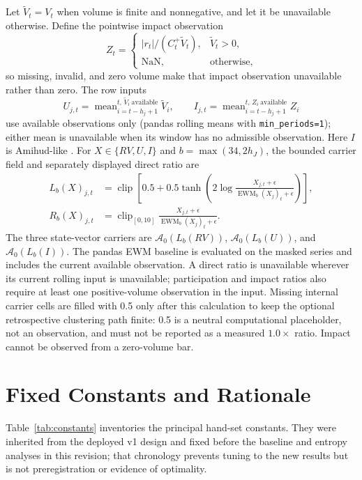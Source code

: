 \documentclass{article}
\newcommand{\clip}{\operatorname{clip}}
\newcommand{\EWM}{\operatorname{EWM}}
\begin{document}
Let $\widetilde V_t=V_t$ when volume is finite and nonnegative, and let it be unavailable otherwise. Define the pointwise impact observation
\begin{equation}
Z_t=\begin{cases}|r_t|/(C_t^+\widetilde V_t),&\widetilde V_t>0,\\
\mathrm{NaN},&\text{otherwise},\end{cases}
\end{equation}
so missing, invalid, and zero volume make that impact observation unavailable rather than zero. The row inputs
\begin{equation}
U_{j,t}=\operatorname{mean}_{i=t-h_j+1}^{t,\,\widetilde V_i\ \mathrm{available}}\widetilde V_i,
\qquad
I_{j,t}=\operatorname{mean}_{i=t-h_j+1}^{t,\,Z_i\ \mathrm{available}}Z_i
\end{equation}
use available observations only (pandas rolling means with \texttt{min\_periods=1}); either mean is unavailable when its window has no admissible observation. Here $I$ is Amihud-like \citep{amihud2002illiquidity}. For $X\in\{RV,U,I\}$ and $b=\max(34,2h_J)$, the bounded carrier field and separately displayed direct ratio are
\begin{align}
L_b(X)_{j,t}&=\clip\left[0.5+0.5\tanh\left(2\log\frac{X_{j,t}+\epsilon}{\EWM_b(X_j)_t+\epsilon}\right)\right],\\
R_b(X)_{j,t}&=\clip_{[0,10]}\frac{X_{j,t}+\epsilon}{\EWM_b(X_j)_t+\epsilon}.
\end{align}
The three state-vector carriers are $\mathcal A_0(L_b(RV))$, $\mathcal A_0(L_b(U))$, and $\mathcal A_0(L_b(I))$. The pandas EWM baseline is evaluated on the masked series and includes the current available observation. A direct ratio is unavailable wherever its current rolling input is unavailable; participation and impact ratios also require at least one positive-volume observation in the input. Missing internal carrier cells are filled with 0.5 only after this calculation to keep the optional retrospective clustering path finite: 0.5 is a neutral computational placeholder, not an observation, and must not be reported as a measured $1.0\times$ ratio. Impact cannot be observed from a zero-volume bar.

\section{Fixed Constants and Rationale}
\label{app:constants}

Table~\ref{tab:constants} inventories the principal hand-set constants. They were inherited from the deployed v1 design and fixed before the baseline and entropy analyses in this revision; that chronology prevents tuning to the new results but is not preregistration or evidence of optimality.
\end{document}
